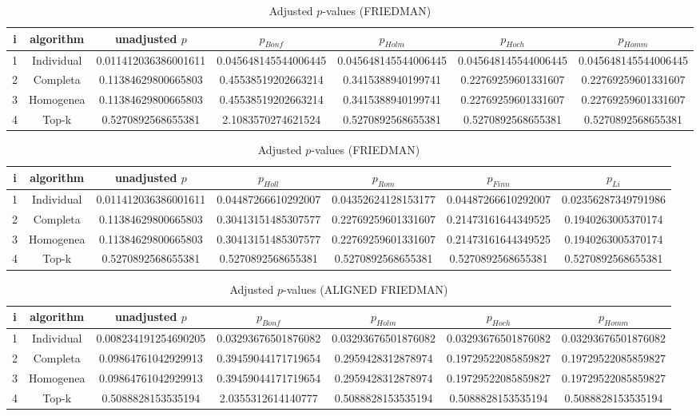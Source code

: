 \documentclass[a4paper,10pt]{article}
\begin{document}
\begin{landscape}
\begin{table}[!htp]
\centering\scriptsize
\caption{Adjusted $p$-values (FRIEDMAN)}
\begin{tabular}{ccccccc}
i&algorithm&unadjusted $p$&$p_{Bonf}$&$p_{Holm}$&$p_{Hoch}$&$p_{Homm}$\\
\hline
1&Individual&0.011412036386001611&0.045648145544006445&0.045648145544006445&0.045648145544006445&0.045648145544006445\\
2&Completa&0.11384629800665803&0.45538519202663214&0.3415388940199741&0.22769259601331607&0.22769259601331607\\
3&Homogenea&0.11384629800665803&0.45538519202663214&0.3415388940199741&0.22769259601331607&0.22769259601331607\\
4&Top-k&0.5270892568655381&2.1083570274621524&0.5270892568655381&0.5270892568655381&0.5270892568655381\\
\hline
\end{tabular}
\end{table}

\begin{table}[!htp]
\centering\scriptsize
\caption{Adjusted $p$-values (FRIEDMAN)}
\begin{tabular}{ccccccc}
i&algorithm&unadjusted $p$&$p_{Holl}$&$p_{Rom}$&$p_{Finn}$&$p_{Li}$\\
\hline
1&Individual&0.011412036386001611&0.04487266610292007&0.04352624128153177&0.04487266610292007&0.02356287349791986\\
2&Completa&0.11384629800665803&0.30413151485307577&0.22769259601331607&0.21473161644349525&0.1940263005370174\\
3&Homogenea&0.11384629800665803&0.30413151485307577&0.22769259601331607&0.21473161644349525&0.1940263005370174\\
4&Top-k&0.5270892568655381&0.5270892568655381&0.5270892568655381&0.5270892568655381&0.5270892568655381\\
\hline
\end{tabular}
\end{table}


\newpage

\begin{table}[!htp]
\centering\scriptsize
\caption{Adjusted $p$-values (ALIGNED FRIEDMAN)}
\begin{tabular}{ccccccc}
i&algorithm&unadjusted $p$&$p_{Bonf}$&$p_{Holm}$&$p_{Hoch}$&$p_{Homm}$\\
\hline
1&Individual&0.008234191254690205&0.03293676501876082&0.03293676501876082&0.03293676501876082&0.03293676501876082\\
2&Completa&0.09864761042929913&0.39459044171719654&0.2959428312878974&0.19729522085859827&0.19729522085859827\\
3&Homogenea&0.09864761042929913&0.39459044171719654&0.2959428312878974&0.19729522085859827&0.19729522085859827\\
4&Top-k&0.5088828153535194&2.0355312614140777&0.5088828153535194&0.5088828153535194&0.5088828153535194\\
\hline
\end{tabular}
\end{table}


\end{landscape}
\end{document}
